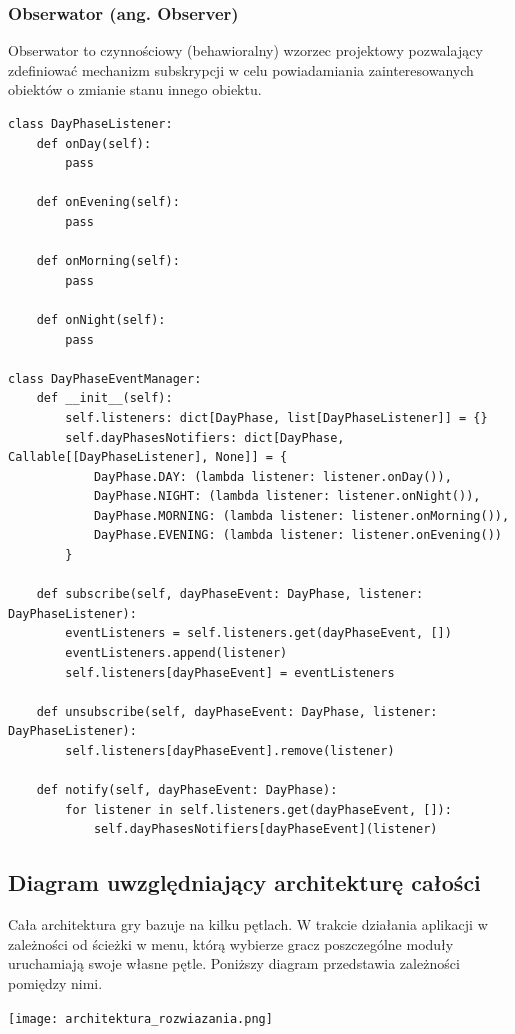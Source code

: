 \documentclass{article}
\begin{document}
\subsubsection{Obserwator (ang. Observer) \cite{wiki:Observer}}
Obserwator to czynnościowy (behawioralny) wzorzec projektowy pozwalający zdefiniować mechanizm subskrypcji w celu powiadamiania zainteresowanych obiektów o zmianie stanu innego obiektu.
\begin{center}
    \begin{lstlisting}[language=pythonSchema]
class DayPhaseListener:
    def onDay(self):
        pass

    def onEvening(self):
        pass

    def onMorning(self):
        pass

    def onNight(self):
        pass

class DayPhaseEventManager:
    def __init__(self):
        self.listeners: dict[DayPhase, list[DayPhaseListener]] = {}
        self.dayPhasesNotifiers: dict[DayPhase, Callable[[DayPhaseListener], None]] = {
            DayPhase.DAY: (lambda listener: listener.onDay()),
            DayPhase.NIGHT: (lambda listener: listener.onNight()),
            DayPhase.MORNING: (lambda listener: listener.onMorning()),
            DayPhase.EVENING: (lambda listener: listener.onEvening())
        }

    def subscribe(self, dayPhaseEvent: DayPhase, listener: DayPhaseListener):
        eventListeners = self.listeners.get(dayPhaseEvent, [])
        eventListeners.append(listener)
        self.listeners[dayPhaseEvent] = eventListeners

    def unsubscribe(self, dayPhaseEvent: DayPhase, listener: DayPhaseListener):
        self.listeners[dayPhaseEvent].remove(listener)

    def notify(self, dayPhaseEvent: DayPhase):
        for listener in self.listeners.get(dayPhaseEvent, []):
            self.dayPhasesNotifiers[dayPhaseEvent](listener)

    \end{lstlisting}
\end{center}
\subsection{Diagram uwzględniający architekturę całości}
Cała architektura gry bazuje na kilku pętlach. W trakcie działania aplikacji w zależności od ścieżki w menu, którą wybierze gracz poszczególne moduły uruchamiają swoje własne pętle. Poniższy diagram przedstawia zależności pomiędzy nimi.
\begin{center}
     \texttt{[image: architektura\_rozwiazania.png]}
\end{center}
\end{document}
